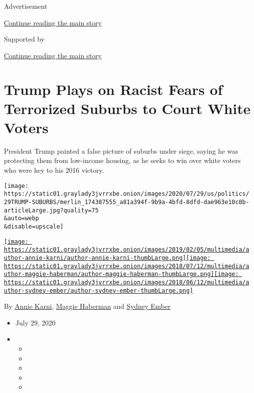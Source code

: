Advertisement

\protect\hyperlink{after-top}{Continue reading the main story}

Supported by

\protect\hyperlink{after-sponsor}{Continue reading the main story}

\hypertarget{trump-plays-on-racist-fears-of-terrorized-suburbs-to-court-white-voters}{%
\section{Trump Plays on Racist Fears of Terrorized Suburbs to Court
White
Voters}\label{trump-plays-on-racist-fears-of-terrorized-suburbs-to-court-white-voters}}

President Trump painted a false picture of suburbs under siege, saying
he was protecting them from low-income housing, as he seeks to win over
white voters who were key to his 2016 victory.

\texttt{[image: https://static01.graylady3jvrrxbe.onion/images/2020/07/29/us/politics/29TRUMP-SUBURBS/merlin\_174387555\_a81a394f-9b9a-4bfd-8dfd-dae963e10c8b-articleLarge.jpg?quality=75\\\&auto=webp\\\&disable=upscale]}

\href{https://www.nytimes3xbfgragh.onion/by/annie-karni}{\texttt{[image: https://static01.graylady3jvrrxbe.onion/images/2019/02/05/multimedia/author-annie-karni/author-annie-karni-thumbLarge.png]}}\href{https://www.nytimes3xbfgragh.onion/by/maggie-haberman}{\texttt{[image: https://static01.graylady3jvrrxbe.onion/images/2018/07/12/multimedia/author-maggie-haberman/author-maggie-haberman-thumbLarge.png]}}\href{https://www.nytimes3xbfgragh.onion/by/sydney-ember}{\texttt{[image: https://static01.graylady3jvrrxbe.onion/images/2018/06/12/multimedia/author-sydney-ember/author-sydney-ember-thumbLarge.png]}}

By \href{https://www.nytimes3xbfgragh.onion/by/annie-karni}{Annie
Karni},
\href{https://www.nytimes3xbfgragh.onion/by/maggie-haberman}{Maggie
Haberman} and
\href{https://www.nytimes3xbfgragh.onion/by/sydney-ember}{Sydney Ember}

\begin{itemize}
\item
  July 29, 2020
\item
  \begin{itemize}
  \item
  \item
  \item
  \item
  \item
  \end{itemize}
\end{itemize}

